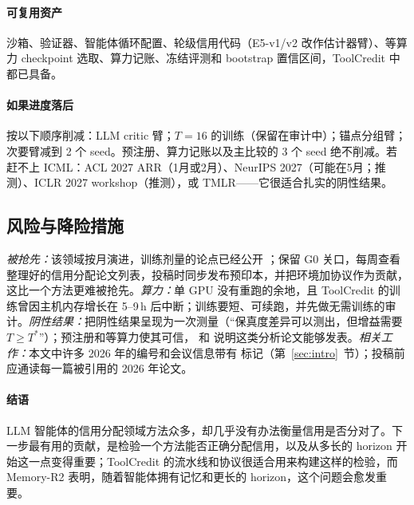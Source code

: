 \paragraph{可复用资产}
沙箱、验证器、智能体循环配置、轮级信用代码（E5-v1/v2 改作估计器臂）、等算力 checkpoint 选取、算力记账、冻结评测和 bootstrap 置信区间，ToolCredit 中都已具备。

\paragraph{如果进度落后}
按以下顺序削减：LLM critic 臂；$T{=}16$ 的训练（保留在审计中）；锚点分组臂；次要臂减到 2 个 seed。预注册、算力记账以及主比较的 3 个 seed 绝不削减。若赶不上 ICML：ACL 2027 ARR（1月或2月\unverified）、NeurIPS 2027（可能在5月；推测）、ICLR 2027 workshop（推测），或 TMLR——它很适合扎实的阴性结果。

\subsection{风险与降险措施}

\emph{被抢先：}该领域按月演进，训练剂量的论点已经公开 \citep{zhang2026credit}；保留 G0 关口，每周查看整理好的信用分配论文列表，投稿时同步发布预印本，并把环境加协议作为贡献，这比一个方法更难被抢先。\emph{算力：}单 GPU 没有重跑的余地，且 ToolCredit 的训练曾因主机内存增长在 5--9\,h 后中断；训练要短、可续跑，并先做无需训练的审计。\emph{阴性结果：}把阴性结果呈现为一次测量（“保真度差异可以测出，但增益需要 $T\geq T^\ast$”）；预注册和等算力使其可信，\citet{yue2025does} 和 \citet{zhang2026credit} 说明这类分析论文能够发表。\emph{相关工作：}本文中许多 2026 年的编号和会议信息带有 \dag{} 标记（第~\ref{sec:intro}~节）；投稿前应通读每一篇被引用的 2026 年论文。

\paragraph{结语}
LLM 智能体的信用分配领域方法众多，却几乎没有办法衡量信用是否分对了。下一步最有用的贡献，是检验一个方法能否正确分配信用，以及从多长的 horizon 开始这一点变得重要；ToolCredit 的流水线和协议很适合用来构建这样的检验，而 Memory-R2 表明，随着智能体拥有记忆和更长的 horizon，这个问题会愈发重要。
